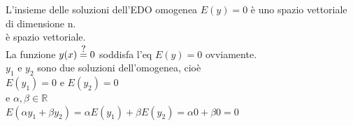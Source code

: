 \documentclass[a4paper, oneside]{article}
\newcommand\eqq{\stackrel{\mathclap{\normalfont\mbox{?}}}{=}}
\begin{document}
\begin{theorem}
    L'insieme delle soluzioni dell'EDO omogenea $E(y)= 0$ è uno spazio vettoriale di dimensione n.\\
    \fbox{*} è spazio vettoriale. \\
    La funzione $y(x) \eqq 0$ soddisfa l'eq $E(y) = 0$ ovviamente.\\
     $y_1$ e $y_2$ sono due soluzioni dell'omogenea, cioè\\
    $E(y_1) = 0$ e $E(y_2) = 0$\\
    e $\alpha , \beta \in \mathbb{R}$ \\
    $E(\alpha y_1 + \beta y_2) = \alpha E(y_1) + \beta E(y_2) = \alpha 0 + \beta 0 = 0$\\ 
\end{theorem}
\end{document}
